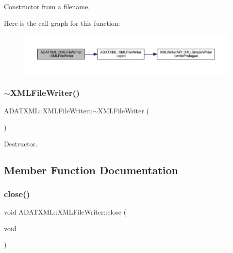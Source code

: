 Constructor from a filename. 

Here is the call graph for this function\+:
\nopagebreak
\begin{figure}[H]
\begin{center}
\leavevmode
\includegraphics[width=350pt]{d6/ddb/classADATXML_1_1XMLFileWriter_a83cf749ff969a30d3de1895f271b238a_cgraph}
\end{center}
\end{figure}
\mbox{\label{classADATXML_1_1XMLFileWriter_af3d1109d92631884682eac46624ca7fd}} 
\subsubsection{\texorpdfstring{$\sim$XMLFileWriter()}{~XMLFileWriter()}\hspace{0.1cm}{\footnotesize\ttfamily [3/3]}}
{\footnotesize\ttfamily A\+D\+A\+T\+X\+M\+L\+::\+X\+M\+L\+File\+Writer\+::$\sim$\+X\+M\+L\+File\+Writer (\begin{DoxyParamCaption}{ }\end{DoxyParamCaption})}



Destructor. 



\subsection{Member Function Documentation}
\mbox{\label{classADATXML_1_1XMLFileWriter_a1a51ceb51781ac6f3a476dcf99a75017}} 
\subsubsection{\texorpdfstring{close()}{close()}\hspace{0.1cm}{\footnotesize\ttfamily [1/3]}}
{\footnotesize\ttfamily void A\+D\+A\+T\+X\+M\+L\+::\+X\+M\+L\+File\+Writer\+::close (\begin{DoxyParamCaption}\item[{void}]{ }\end{DoxyParamCaption})}



